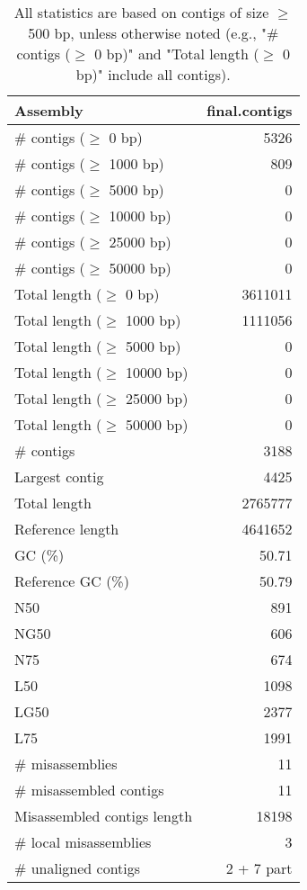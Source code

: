 \documentclass[12pt,a4paper]{article}
\begin{document}
\begin{table}[ht]
\begin{center}
\caption{All statistics are based on contigs of size $\geq$ 500 bp, unless otherwise noted (e.g., "\# contigs ($\geq$ 0 bp)" and "Total length ($\geq$ 0 bp)" include all contigs).}
\begin{tabular}{|l*{1}{|r}|}
\hline
Assembly & final.contigs \\ \hline
\# contigs ($\geq$ 0 bp) & 5326 \\ \hline
\# contigs ($\geq$ 1000 bp) & 809 \\ \hline
\# contigs ($\geq$ 5000 bp) & 0 \\ \hline
\# contigs ($\geq$ 10000 bp) & 0 \\ \hline
\# contigs ($\geq$ 25000 bp) & 0 \\ \hline
\# contigs ($\geq$ 50000 bp) & 0 \\ \hline
Total length ($\geq$ 0 bp) & 3611011 \\ \hline
Total length ($\geq$ 1000 bp) & 1111056 \\ \hline
Total length ($\geq$ 5000 bp) & 0 \\ \hline
Total length ($\geq$ 10000 bp) & 0 \\ \hline
Total length ($\geq$ 25000 bp) & 0 \\ \hline
Total length ($\geq$ 50000 bp) & 0 \\ \hline
\# contigs & 3188 \\ \hline
Largest contig & 4425 \\ \hline
Total length & 2765777 \\ \hline
Reference length & 4641652 \\ \hline
GC (\%) & 50.71 \\ \hline
Reference GC (\%) & 50.79 \\ \hline
N50 & 891 \\ \hline
NG50 & 606 \\ \hline
N75 & 674 \\ \hline
L50 & 1098 \\ \hline
LG50 & 2377 \\ \hline
L75 & 1991 \\ \hline
\# misassemblies & 11 \\ \hline
\# misassembled contigs & 11 \\ \hline
Misassembled contigs length & 18198 \\ \hline
\# local misassemblies & 3 \\ \hline
\# unaligned contigs & 2 + 7 part \\ \hline

\end{tabular}
\end{center}
\end{table}
\end{document}
